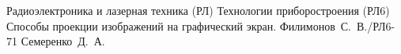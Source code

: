 \documentclass{bmstu}
\begin{document}
\renewcommand{\labelenumii}{\arabic{enumi}.\arabic{enumii}}
\renewcommand{\labelenumiii}{\arabic{enumi}.\arabic{enumii}.\arabic{enumiii}}
\renewcommand{\labelenumiv}{\arabic{enumi}.\arabic{enumii}.\arabic{enumiii}.\arabic{enumiv}}

\makecourseworktitle
	{Радиоэлектроника и лазерная техника (РЛ)}
	{Технологии приборостроения (РЛ6)}
	{Способы проекции изображений на графический экран.}
	{Филимонов~С.~В./РЛ6-71}
	{Семеренко~Д.~А.}
	{}
	{}
	{}

\maketableofcontents

%
%



%
\end{document}
